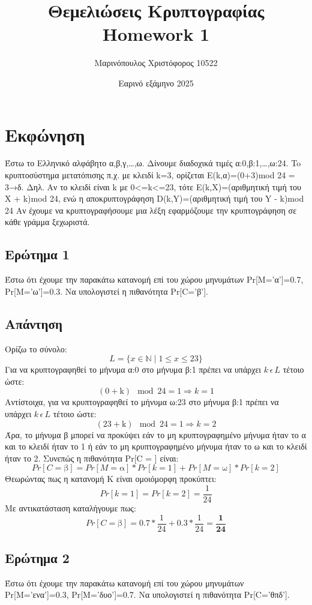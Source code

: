 \documentclass[12pt]{article}
\title{\vspace{-2cm} Θεμελιώσεις Κρυπτογραφίας \\
        Homework 1}
\author{Μαρινόπουλος Χριστόφορος 10522}
\date{Εαρινό εξάμηνο 2025}
\begin{document}
\maketitle

\section*{Εκφώνηση}
Έστω το Eλληνικό αλφάβητο {α,β,γ,…,ω}. Δίνουμε διαδοχικά τιμές
α:0,β:1,…,ω:24. To κρυπτοσύστημα μετατόπισης π.χ. με κλειδί k=3, ορίζεται
E(k,α)=(0+3)mod 24 = 3→δ. Δηλ. Αν το κλειδί είναι k με 0<=k<=23, τότε
Ε(k,X)=(αριθμητική τιμή του X + k)mod 24, ενώ η αποκρυπτογράφηση
D(k,Y)=(αριθμητική τιμή του Y - k)mod 24
Αν έχουμε να κρυπτογραφήσουμε μια λέξη εφαρμόζουμε την κρυπτογράφηση σε κάθε γράμμα
ξεχωριστά.

\subsection*{Ερώτημα 1}
Έστω ότι έχουμε την παρακάτω κατανομή επί του χώρου μηνυμάτων
Pr[M=’α’]=0.7, Pr[M=’ω’]=0.3.
Να υπολογιστεί η πιθανότητα Pr[C=’β’].

\subsection*{Απάντηση}
Ορίζω το σύνολο:
\begin{equation*}
L = \{ x \in \mathbb{N} \mid 1 \leq x \leq 23 \}
\end{equation*}
\newline
Για να κρυπτογραφηθεί το μήνυμα α:0 στο μήνυμα β:1 πρέπει να υπάρχει \( k \, \epsilon \, L \) τέτοιο ώστε: 
\[
(0 + \text{k})\mod24 = 1 \Rightarrow k = 1  
\]
Αντίστοιχα, για να κρυπτογραφηθεί το μήνυμα ω:23 στο μήνυμα β:1 πρέπει  να υπάρχει \( k \, \epsilon \, L \) τέτοιο ώστε:
\[
(23 + \text{k})\mod 24 = 1 \Rightarrow k = 2 
\]
Άρα, το μήνυμα β μπορεί να προκύψει εάν το μη κρυπτογραφημένο μήνυμα ήταν το α και το κλειδί ήταν το 1 ή εάν το μη κρυπτογραφημένο μήνυμα ήταν το ω και το κλειδί ήταν το 2. 
\newline
\newline
Συνεπώς η πιθανότητα Pr[C = ] είναι:
\[
Pr[C = \text{β}] = Pr[M = \text{α}] * Pr[k = 1] + Pr[M = \text{ω}] * Pr[k = 2]
\]
Θεωρώντας πως η κατανομή Κ είναι ομοιόμορφη προκύπτει:
\[
Pr[k = 1] = Pr[k = 2] = \frac{1}{24}
\]
Με αντικατάσταση καταλήγουμε πως:
\[
Pr[C = \text{β}] =0.7 * \frac{1}{24} + 0.3 * \frac{1}{24} = \mathbf{\frac{1}{24}}
\]
\hfill \blacksquare
\newpage
\subsection*{Ερώτημα 2}
Έστω ότι έχουμε την παρακάτω κατανομή επί του χώρου μηνυμάτων
Pr[M=’ενα’]=0.3, Pr[M=’δυο’]=0.7.
Να υπολογιστεί η πιθανότητα Pr[C=’θπδ’].
\end{document}
